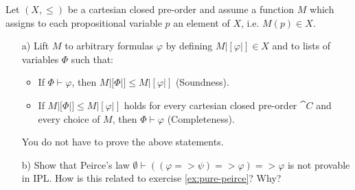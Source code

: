 \begin{exercise}
    Let $(X, \le)$ be a cartesian closed pre-order and assume a function $M$ which assigns to each propositional variable $p$ an element of $X$, i.e. $M(p) \in X$.
    \begin{itemize}
        \item[a)] Lift $M$ to arbitrary formulas $\varphi$ by defining $M|[\varphi|] \in X$ and to lists of variables $\Phi$ such that:
            \begin{itemize}
                \item If $\Phi \vdash \varphi$, then $M|[\Phi|] \le M|[\varphi|]$ (Soundness).
                \item If $M|[\Phi|] \le M|[\varphi|]$ holds for every cartesian closed pre-order $\cat{C}$ and every choice of $M$, then $\Phi \vdash \varphi$ (Completeness).
            \end{itemize}
            You do not have to prove the above statements.
        \item[b)] Show that Peirce's law $\emptyset \vdash ((\varphi => \psi) => \varphi) => \varphi$ is not provable in IPL.
            How is this related to exercise \ref{ex:pure-peirce}? Why?
    \end{itemize}
\end{exercise}
